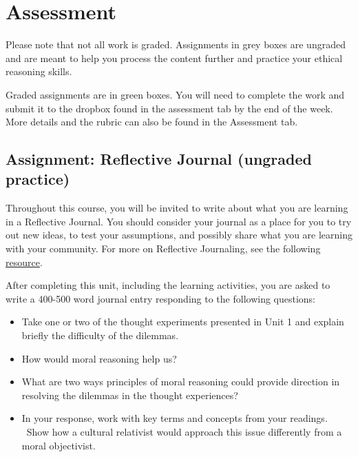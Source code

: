 \documentclass[
]{book}
\providecommand{\tightlist}{%
  \setlength{\itemsep}{0pt}\setlength{\parskip}{0pt}}
\begin{document}
\hypertarget{assessment}{%
\section*{Assessment}\label{assessment}}

\begin{assessment}
Please note that not all work is graded. Assignments in grey boxes are ungraded and are meant to help you process the content further and practice your ethical reasoning skills.

Graded assignments are in green boxes. You will need to complete the work and submit it to the dropbox found in the assessment tab by the end of the week. More details and the rubric can also be found in the Assessment tab.
\end{assessment}

\hypertarget{assignment-reflective-journal-ungraded-practice}{%
\subsection*{Assignment: Reflective Journal (ungraded practice)}\label{assignment-reflective-journal-ungraded-practice}}

Throughout this course, you will be invited to write about what you are learning
in a Reflective Journal. You should consider your journal as a place for you to
try out new ideas, to test your assumptions, and possibly share what you are
learning with your community. For more on Reflective Journaling, see the
following \href{assets/unit_1/Reflective_Journaling.pdf}{resource}.

After completing this unit, including the learning activities, you are asked to
write a 400-500 word journal entry responding to the following questions:

\begin{itemize}
\tightlist
\item
  Take one or two of the thought experiments presented in Unit 1 and explain
  briefly the difficulty of the dilemmas.
\item
  How would moral reasoning help us? ~
\item
  What are two ways principles of moral reasoning could provide direction in
  resolving the dilemmas in the thought experiences?
\item
  In your response, work with key terms and concepts from your readings. ~Show
  how a cultural relativist would approach this issue differently from a moral
  objectivist.
\end{itemize}
\end{document}
